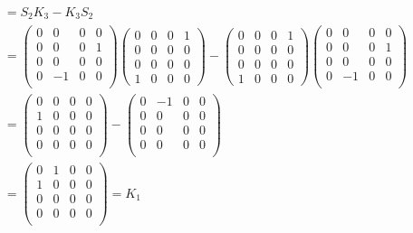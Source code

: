 \documentclass[11pt]{article}
\begin{document}
\begin{gather*}
    [S_{2}, K_{3}] = S_{2}K_{3} - K_{3}S_{2} \\
    =
    \begin{pmatrix}
    0 & 0 & 0 & 0 \\
    0 & 0 & 0 & 1 \\
    0 & 0 & 0 & 0\\
    0 & -1 & 0 & 0 \\
    \end{pmatrix} 
\left(\begin{array}{llll}
0 & 0 & 0 & 1 \\
0 & 0 & 0 & 0 \\
0 & 0 & 0 & 0 \\
1 & 0 & 0 & 0
\end{array}\right)
    -
\left(\begin{array}{llll}
0 & 0 & 0 & 1 \\
0 & 0 & 0 & 0 \\
0 & 0 & 0 & 0 \\
1 & 0 & 0 & 0
\end{array}\right)
    \begin{pmatrix}
    0 & 0 & 0 & 0 \\
    0 & 0 & 0 & 1 \\
    0 & 0 & 0 & 0\\
    0 & -1 & 0 & 0 \\
    \end{pmatrix} \\
    =
    \begin{pmatrix}
    0 & 0 & 0 & 0 \\
    1 & 0 & 0 & 0 \\
    0 & 0 & 0 & 0\\
    0 & 0 & 0 & 0 \\
    \end{pmatrix}
    -
    \begin{pmatrix}
    0 & -1 & 0 & 0 \\
    0 & 0 & 0 & 0 \\
    0 & 0 & 0 & 0\\
    0 & 0 & 0 & 0 \\
    \end{pmatrix} \\
    =
    \begin{pmatrix}
    0 & 1 & 0 & 0 \\
    1 & 0 & 0 & 0 \\
    0 & 0 & 0 & 0 \\
    0 & 0 & 0 & 0 \\
    \end{pmatrix} = K_{1}
\end{gather*}
\end{document}
